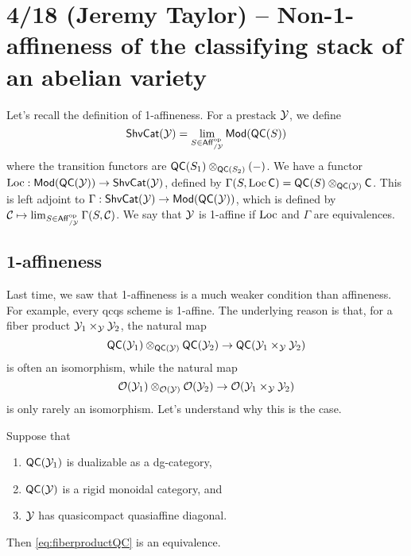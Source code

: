 \documentclass{article}
\begin{document}
\section{4/18 (Jeremy Taylor) -- Non-1-affineness of the classifying stack of an abelian variety}

Let's recall the definition of 1-affineness.
For a prestack $\mathcal{Y}$, we define
\[
	\mathsf{ShvCat}(\mathcal{Y}) = \lim_{S \in \mathsf{Aff}_{/\mathcal{Y}}^{\mathrm{op}}} \mathsf{Mod}(\mathsf{QC}(S))
\]
where the transition functors are $\mathsf{QC}(S_1) \otimes_{\mathsf{QC}(S_2)} (-)$.
We have a functor $\operatorname{Loc}: \mathsf{Mod}(\mathsf{QC}(\mathcal{Y})) \to \mathsf{ShvCat}(\mathcal{Y})$, defined by $\Gamma(S, \operatorname{Loc} \mathsf{C}) = \mathsf{QC}(S) \otimes_{\mathsf{QC}(\mathcal{Y})} \mathsf{C}$.
This is left adjoint to $\Gamma: \mathsf{ShvCat}(\mathcal{Y}) \to \mathsf{Mod}(\mathsf{QC}(\mathcal{Y}))$, which is defined by $\mathcal{C} \mapsto \lim_{S \in \mathsf{Aff}_{/\mathcal{Y}}^{\mathrm{op}}} \Gamma(S, \mathcal{C})$.
We say that $\mathcal{Y}$ is 1-affine if $\operatorname{Loc}$ and $\Gamma$ are equivalences.

\subsection{1-affineness}

Last time, we saw that 1-affineness is a much weaker condition than affineness.
For example, every qcqs scheme is 1-affine.
The underlying reason is that, for a fiber product $\mathcal{Y}_1 \times_{\mathcal{Y}} \mathcal{Y}_2$, the natural map 
\begin{equation} \label{eq:fiberproductQC}
	\mathsf{QC}(\mathcal{Y}_1) \otimes_{\mathsf{QC}(\mathcal{Y})} \mathsf{QC}(\mathcal{Y}_2) \to \mathsf{QC}(\mathcal{Y}_1 \times_{\mathcal{Y}} \mathcal{Y}_2)
\end{equation}
is often an isomorphism, while the natural map 
\[
	\mathcal{O}(\mathcal{Y}_1) \otimes_{\mathcal{O}(\mathcal{Y})} \mathcal{O}(\mathcal{Y}_2) \to \mathcal{O}(\mathcal{Y}_1 \times_{\mathcal{Y}} \mathcal{Y}_2)
\]
is only rarely an isomorphism.
Let's understand why this is the case.

\begin{prop}
	Suppose that
	\begin{enumerate}
		\item $\mathsf{QC}(\mathcal{Y}_1)$ is dualizable as a dg-category,
		\item $\mathsf{QC}(\mathcal{Y})$ is a rigid monoidal category, and
		\item $\mathcal{Y}$ has quasicompact quasiaffine diagonal.
	\end{enumerate}
	Then \eqref{eq:fiberproductQC} is an equivalence.
\end{prop}
\end{document}
